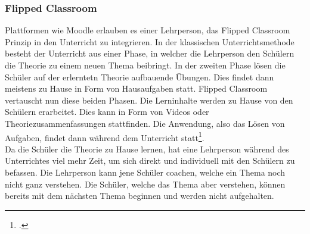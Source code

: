 %
%
%

\subsubsection{Flipped Classroom}
Plattformen wie Moodle erlauben es einer Lehrperson, das Flipped Classroom Prinzip in den Unterricht zu integrieren. In der klassischen Unterrichtsmethode besteht der Unterricht aus einer Phase, in welcher die Lehrperson den Schülern die Theorie zu einem neuen Thema beibringt. In der zweiten Phase lösen die Schüler auf der erlerntetn Theorie aufbauende Übungen. Dies findet dann meistens zu Hause in Form von Hausaufgaben statt. Flipped Classroom vertauscht nun diese beiden Phasen. Die Lerninhalte werden zu Hause von den Schülern erarbeitet. Dies kann in Form von Videos oder Theoriezusammenfassungen stattfinden. Die Anwendung, also das Lösen von Aufgaben, findet dann während dem Unterricht statt\footcite{flipped_classroom_theorie}. \\

Da die Schüler die Theorie zu Hause lernen, hat eine Lehrperson während des Unterrichtes viel mehr Zeit, um sich direkt und individuell mit den Schülern zu befassen. Die Lehrperson kann jene Schüler coachen, welche ein Thema noch nicht ganz verstehen. Die Schüler, welche das Thema aber verstehen, können bereits mit dem nächsten Thema beginnen und werden nicht aufgehalten. \\


